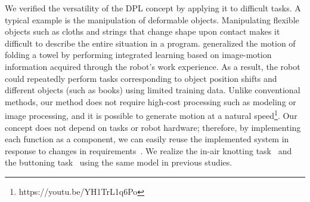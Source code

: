 We verified the versatility of the DPL concept by applying it to difficult tasks. A typical example is the manipulation of deformable objects. Manipulating flexible objects such as cloths and strings that change shape upon contact makes it difficult to describe the entire situation in a program. \cite{Koma2016ral} generalized the motion of folding a towel by performing integrated learning based on image-motion information acquired through the robot's work experience. As a result, the robot could repeatedly perform tasks corresponding to object position shifts and different objects (such as books) using limited training data. Unlike conventional methods, our method does not require high-cost processing such as modeling or image processing, and it is possible to generate motion at a natural speed\footnote{https://youtu.be/YH1TrL1q6Po}. Our concept does not depend on tasks or robot hardware; therefore, by implementing each function as a component, we can easily reuse the implemented system in response to changes in requirements~\cite{Kanamura2021sensors}. We realize the in-air knotting task~\cite{Suzuki2021iros} and the buttoning task~\cite{Fujii2022sii} using the same model in previous studies.


